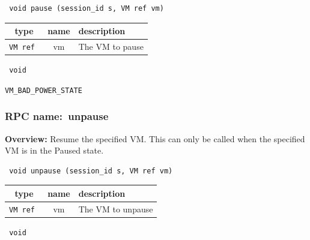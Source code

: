 \begin{verbatim} void pause (session_id s, VM ref vm)\end{verbatim}



 
\vspace{0.3cm}
\begin{tabular}{|c|c|p{7cm}|}
 \hline
{\bf type} & {\bf name} & {\bf description} \\ \hline
{\tt VM ref } & vm & The VM to pause \\ \hline 

\end{tabular}

\vspace{0.3cm}

{\tt 
void
}



\vspace{0.3cm}

 {\tt VM\_BAD\_POWER\_STATE}

\vspace{0.6cm}
\subsubsection{RPC name:~unpause}

{\bf Overview:} 
Resume the specified VM. This can only be called when the specified VM is in the Paused state.

\begin{verbatim} void unpause (session_id s, VM ref vm)\end{verbatim}



 
\vspace{0.3cm}
\begin{tabular}{|c|c|p{7cm}|}
 \hline
{\bf type} & {\bf name} & {\bf description} \\ \hline
{\tt VM ref } & vm & The VM to unpause \\ \hline 

\end{tabular}

\vspace{0.3cm}

{\tt 
void
}



\vspace{0.3cm}

